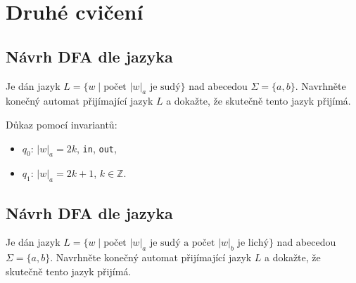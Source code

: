 \section{Druhé cvičení}

\subsection{Návrh DFA dle jazyka}

Je dán jazyk $L = \{w \mid \text{počet } |w|_a \text{ je sudý}\}$ nad abecedou $\Sigma = \{a,b\}$. Navrhněte konečný
automat přijímající jazyk $L$ a dokažte, že skutečně tento jazyk přijímá.

\begin{multicols}{2}

    Důkaz pomocí invariantů:
    \begin{itemize}[noitemsep]
        \item $q_0$: $|w|_a = 2k$, \texttt{in}, \texttt{out},
        \item $q_1$: $|w|_a = 2k + 1$, $k \in \mathbb{Z}$.
    \end{itemize}
\end{multicols}

\subsection{Návrh DFA dle jazyka}
Je dán jazyk $L = \{w \mid \text{počet } |w|_a \text{ je sudý a počet } |w|_b \text{ je lichý}\}$ nad abecedou
$\Sigma = \{a,b\}$. Navrhněte konečný automat přijímající jazyk $L$ a dokažte, že skutečně tento jazyk přijímá.

